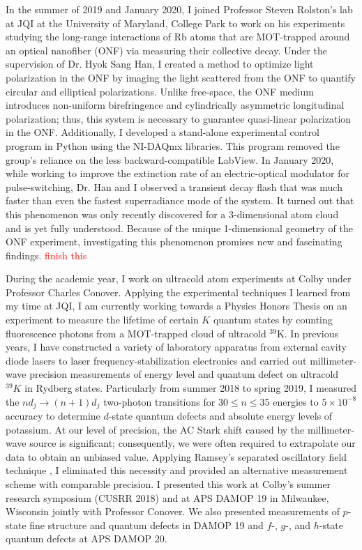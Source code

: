 \documentclass[12pt]{article}
\begin{document}
In the summer of 2019 and January 2020, I joined Professor Steven Rolston's lab at JQI at the University of Maryland, College Park to work on his experiments studying the long-range interactions of Rb atoms that are MOT-trapped around an optical nanofiber (ONF) via measuring their collective decay. Under the supervision of Dr. Hyok Sang Han, I created a method to optimize light polarization in the ONF by imaging the light scattered from the ONF to quantify circular and elliptical polarizations. Unlike free-space, the ONF medium introduces non-uniform birefringence and cylindrically asymmetric longitudinal polarization; thus, this system is necessary to guarantee quasi-linear polarization in the ONF. Additionally, I developed a stand-alone experimental control program in Python using the NI-DAQmx libraries. This program removed the group's reliance on the less backward-compatible LabView. In January 2020, while working to improve the extinction rate of an electric-optical modulator for pulse-switching, Dr. Han and I observed a transient decay flash that was much faster than even the fastest superradiance mode of the system. It turned out that this phenomenon was only recently discovered for a 3-dimensional atom cloud and is yet fully understood. Because of the unique 1-dimensional geometry of the ONF experiment, investigating this phenomenon promises new and fascinating findings.   \textcolor{red}{finish this} \\ \vspace{-9pt}

During the academic year, I work on ultracold atom experiments at Colby under Professor Charles Conover. Applying the experimental techniques I learned from my time at JQI, I am currently working towards a Physics Honors Thesis on an experiment to measure the lifetime of certain $K$ quantum states by counting fluorescence photons from a MOT-trapped cloud of ultracold $^{39}$K. In previous years, I have constructed a variety of laboratory apparatus from external cavity diode lasers to laser frequency-stabilization electronics and carried out millimeter-wave precision measurements of energy level and quantum defect on ultracold $^{39}K$ in Rydberg states. Particularly from summer 2018 to spring 2019, I measured the $nd_j \to (n+1)d_j$ two-photon transitions for $30 \leq n \leq 35$ energies to $5\times 10^{-8}$ accuracy to determine $d$-state quantum defects and absolute energy levels of potassium. At our level of precision, the AC Stark shift caused by the millimeter-wave source is significant; consequently, we were often required to extrapolate our data to obtain an unbiased value. Applying Ramsey's separated oscillatory field technique \cite{PhysRev.78.695}, I eliminated this necessity and provided an alternative measurement scheme with comparable precision. I presented this work at Colby's summer research symposium (CUSRR 2018) and at APS DAMOP 19 in Milwaukee, Wisconsin jointly with Professor Conover. We also presented measurements of $p$-state fine structure and quantum defects in DAMOP 19 and $f$-, $g$-, and $h$-state quantum defects at APS DAMOP 20. \\ \vspace{-9pt}
\end{document}
